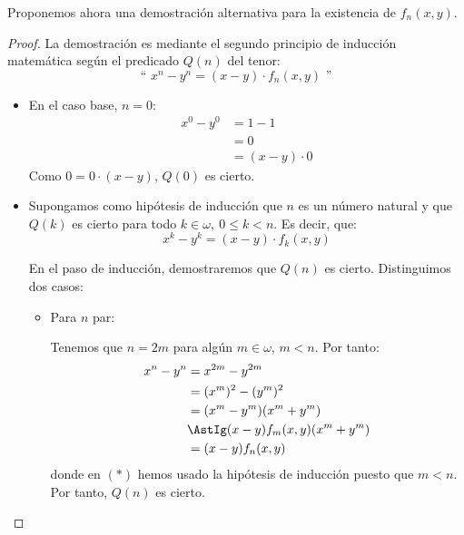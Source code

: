 \documentclass[12pt]{article}
\begin{document}
\begin{ejercicio}[Inducción]
            \begin{observacion}
                Proponemos ahora una demostración alternativa para la existencia de $f_n(x, y)$.
                \begin{proof}
                La demostración es mediante el segundo principio de inducción matemática
                según el predicado $Q(n)$ del tenor:
                \begin{equation*}
                    \text{`` }x^n - y^n = (x-y)\cdot f_n(x, y)\text{ ''}
                \end{equation*}
                \begin{itemize}
                    \item En el caso base, $n=0$:
                        \begin{align*}
                            x^0 - y^0 &= 1 - 1 \\&= 0 \\&= (x-y)\cdot 0
                        \end{align*}
                        Como $0 = 0\cdot (x-y)$, $Q(0)$ es cierto.

                    \item Supongamos como hipótesis de inducción que $n$ es un número natural y que $Q(k)$ es cierto para todo $k\in\omega,~0\leq k< n$.
                    Es decir, que:
                        \begin{equation*}
                            x^k - y^k = (x-y)\cdot f_k(x, y)
                        \end{equation*}

                        En el paso de inducción, demostraremos que $Q(n)$ es cierto. Distinguimos dos casos:
                        \begin{itemize}
                            \item Para $n$ par:
                            
                            Tenemos que $n=2m$ para algún $m\in\omega$, $m<n$. Por tanto:
                            \begin{align*}
                                x^n - y^n &= x^{2m} - y^{2m} \\
                                &= (x^m)^2 - (y^m)^2 \\
                                &= (x^m - y^m)(x^m + y^m)\\
                                &\AstIg (x-y)f_m(x, y)(x^m + y^m)\\
                                &= (x-y)f_{n}(x, y)
                            \end{align*}
                            donde en $(\ast)$ hemos usado la hipótesis de inducción puesto que $m<n$. Por tanto, $Q(n)$ es cierto.
                            

\end{itemize}
\end{itemize}
\end{proof}
\end{observacion}
\end{ejercicio}
\end{document}
